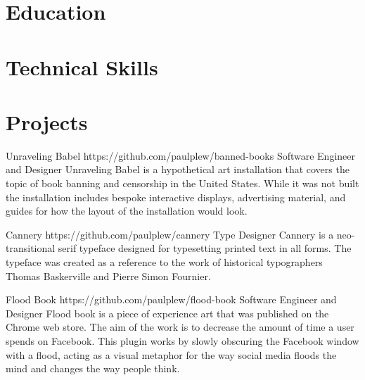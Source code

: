 \documentclass{resume}
\begin{document}
\section{Education}


\section{Technical Skills}

\section{Projects}
\project
    {Unraveling Babel}
    {https://github.com/paulplew/banned-books}
    {Software Engineer and Designer}
    {Unraveling Babel is a hypothetical art installation that covers the topic of book banning
    and censorship in the United States. While it was not built the installation includes
    bespoke interactive displays, advertising material, and guides for how the layout
    of the installation would look.}

\project
    {Cannery}
    {https://github.com/paulplew/cannery}
    {Type Designer}
    {Cannery is a neo-transitional serif typeface designed for typesetting printed text
    in all forms. The typeface was created as a reference to the work of historical 
    typographers Thomas Baskerville and Pierre Simon Fournier.}

\project
    {Flood Book}
    {https://github.com/paulplew/flood-book}
    {Software Engineer and Designer}
    {Flood book is a piece of experience art that was published on the Chrome web store.
    The aim of the work is to decrease the amount of time a user spends on Facebook. This plugin works by 
    slowly obscuring the Facebook window with a flood, acting as a visual metaphor
    for the way social media floods the mind and changes the way people think.}
\end{document}
